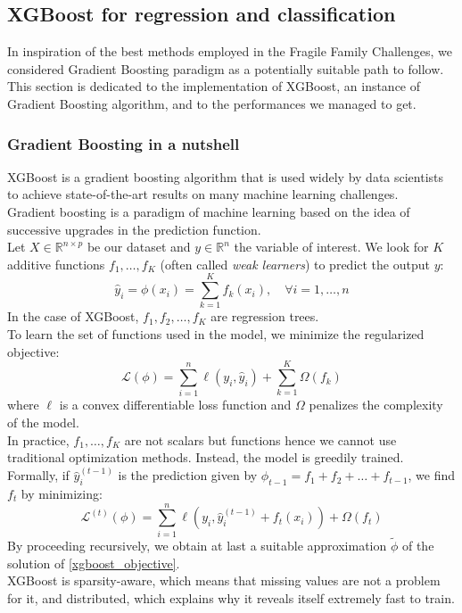 \documentclass[]{article}
\begin{document}
\subsection{XGBoost for regression and classification}
In inspiration of the best methods employed in the Fragile Family Challenges, we considered Gradient Boosting paradigm as a potentially suitable path to follow. This section is dedicated to the implementation of XGBoost, an instance of Gradient Boosting algorithm, and to the performances we managed to get.
\subsubsection{Gradient Boosting in a nutshell}
XGBoost \cite{xgboost2016} is a gradient boosting algorithm that is used widely by data scientists to achieve state-of-the-art results on many machine learning challenges.\\
Gradient boosting is a paradigm of machine learning based on the idea of successive upgrades in the prediction function.\\

\noindent
Let $X\in \mathbb{R}^{n\times p}$ be our dataset and $y\in \mathbb{R}^n$ the variable of interest. We look for $K$ additive functions $f_1,\dots,f_K$ (often called \textit{weak learners}) to predict the output $y$:
\begin{equation}
	\hat{y}_i = \phi(x_i) = \sum_{k=1}^K f_k(x_i),\quad \forall i=1, \dots, n
\end{equation}
In the case of XGBoost, $f_1,f_2,\dots,f_K$ are regression trees.\\
To learn the set of functions used in the model, we minimize the regularized objective:
\begin{equation}
	\label{xgboost_objective}
	\mathcal{L}(\phi) = \sum_{i=1}^n \ell(y_i, \hat{y}_i) + \sum_{k=1}^K\Omega(f_k)
\end{equation}
where $\ell$ is a convex differentiable loss function and $\Omega$ penalizes the complexity of the model.\\

\noindent
In practice, $f_1,\dots,f_K$ are not scalars but functions hence we cannot use traditional optimization methods. Instead, the model is greedily trained. Formally, if $\hat{y}^{(t-1)}_i$ is the prediction given by $\phi_{t-1} = f_1 + f_2 + \dots + f_{t-1}$, we find $f_t$ by minimizing:
\begin{equation}
	\mathcal{L}^{(t)}(\phi) = \sum_{i=1}^n \ell(y_i, \hat{y}^{(t-1)}_i + f_t(x_i)) + \Omega(f_t)
\end{equation}
By proceeding recursively, we obtain at last a suitable approximation $\tilde{\phi}$ of the solution of \eqref{xgboost_objective}.\\
XGBoost is sparsity-aware, which means that missing values are not a problem for it, and distributed, which explains why it reveals itself extremely fast to train.
\end{document}
